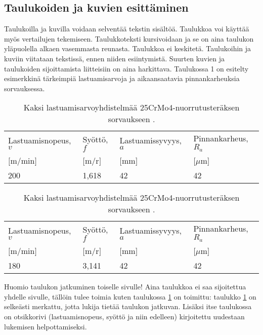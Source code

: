 \documentclass{LUT_pohja}[2016/03/09 LUT Dippa Pohja]
\begin{document}
\subsection{Taulukoiden ja kuvien esittäminen}
Taulukoilla ja kuvilla voidaan selventää tekstin sisältöä. Taulukkoa voi käyttää myös 
vertailujen tekemiseen. Taulukkoteksti kursivoidaan ja se on aina taulukon yläpuolella alkaen vasemmasta reunasta. Taulukkoa ei keskitetä. Taulukoihin ja kuviin viitataan tekstissä, ennen niiden esiintymistä. \citep[s.98.]{Leino00} Suurten kuvien ja taulukoiden sijoittamista liitteisiin on aina harkittava. Taulukossa 1 on esitelty esimerkkinä tärkeimpiä lastuamisarvoja ja aikaansaatavia pinnankarheuksia sorvauksessa.
\begin{table}[htb]
\caption{Kaksi lastuamisarvoyhdistelmää 25CrMo4-nuorrutusteräksen sorvaukseen \citep[s. 34]{Varis97}.}
\begin{tabular}{|l|l|l|l|}
	\hline
  Lastuamisnopeus, $v$ & Syöttö, $f$  & Lastuamissyvyys, $a$ & Pinnankarheus, $R_{a}$\\
  $[$m/min$]$ & $[$m/r$]$ & $[$mm$]$ & $[\mu$m$]$\\ \hline
  200 & 1,618 & 42 & 42\\ \hline
\end{tabular}
\end{table}

\newpage
\addtocounter{table}{-1}%
\begin{table}[htb]
\caption{Kaksi lastuamisarvoyhdistelmää 25CrMo4-nuorrutusteräksen sorvaukseen \citep[s. 34]{Varis97}.}
	\label{table:Lastuamis}
\begin{tabular}{|l|l|l|l|}
	\hline
  Lastuamisnopeus, $v$ & Syöttö, $f$  & Lastuamissyvyys, $a$ & Pinnankarheus, $R_{a}$\\
  $[$m/min$]$ & $[$m/r$]$ & $[$mm$]$ & $[\mu$m$]$\\ \hline
  180 & 3,141 & 42 & 42\\ \hline
\end{tabular}
\end{table}
Huomio taulukon jatkuminen toiselle sivulle! Aina taulukkoa ei saa sijoitettua yhdelle 
sivulle, tällöin tulee toimia kuten taulukossa \ref{table:Lastuamis} on toimittu: taulukko \ref{table:Lastuamis} on selkeästi merkattu, jotta lukija tietää taulukon jatkuvan. Lisäksi itse taulukossa on otsikkorivi (lastuamisnopeus, syöttö ja niin edelleen) kirjoitettu uudestaan lukemisen helpottamiseksi.\par
\end{document}

